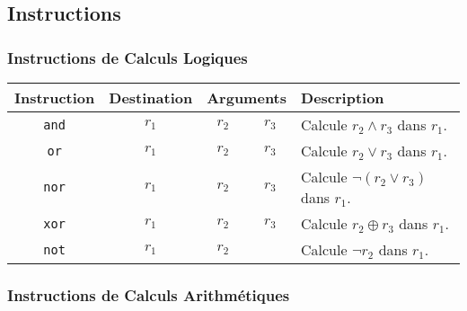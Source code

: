 \documentclass[french, 12pt]{article}
\begin{document}
\subsection*{Instructions}

\renewcommand\tabularxcolumn[1]{m{#1}}
\renewcommand{\arraystretch}{1.5}

\subsubsection*{Instructions de Calculs Logiques}
\noindent
\begin{tabularx}{\textwidth}{cccc X}
      \toprule
      Instruction  & Destination & \multicolumn{2}{c}{Arguments} & Description                                             \\
      \midrule
      \texttt{and} & $r_1$       & $r_2$                         & $r_3$       & Calcule $r_2 \land r_3$ dans $r_1$.       \\
      \texttt{or}  & $r_1$       & $r_2$                         & $r_3$       & Calcule $r_2 \lor r_3$ dans $r_1$.        \\
      \texttt{nor} & $r_1$       & $r_2$                         & $r_3$       & Calcule $\neg (r_2 \lor r_3)$ dans $r_1$. \\
      \texttt{xor} & $r_1$       & $r_2$                         & $r_3$       & Calcule $r_2 \oplus r_3$ dans $r_1$.      \\
      \texttt{not} & $r_1$       & $r_2$                         &             & Calcule $\neg r_2$ dans $r_1$.            \\
      \bottomrule
\end{tabularx}

\subsubsection*{Instructions de Calculs Arithmétiques}
\end{document}
